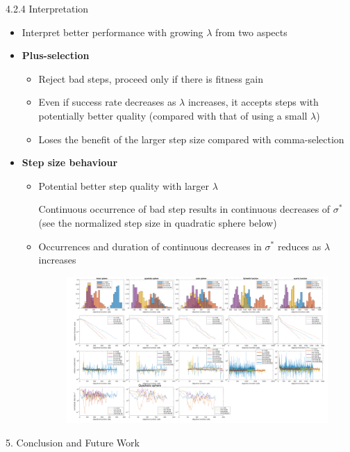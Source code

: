 \documentclass{beamer}
\begin{document}
\begin{frame}{4.2.4 Interpretation}
\begin{itemize}
    \item Interpret better performance with growing $\lambda$ from two aspects
    \item \textbf{Plus-selection }
        \begin{itemize}
            \item Reject bad steps, proceed only if there is fitness gain
            \item Even if success rate decreases as $\lambda$ increases, it accepts steps with potentially better quality (compared with that of using a small $\lambda$)
            \item Loses the benefit of the larger step size compared with comma-selection
        \end{itemize}
    \item \textbf{Step size behaviour}
    \begin{itemize}
            \item Potential better step quality with larger $\lambda$
            
            Continuous occurrence of bad step results in continuous decreases of $\sigma^*$ (see the normalized step size in quadratic sphere below) 
            \item Occurrences and duration of continuous decreases in $\sigma^*$ reduces as $\lambda$ increases
            \begin{figure}
            \includegraphics[width=0.405\linewidth]{normalized_step_emergency.pdf}
            \end{figure}
    \end{itemize}
    
\end{itemize}


\end{frame}

\begin{frame}[plain,c]
\begin{center}
\Huge 5. Conclusion and Future Work
\end{center}
\end{frame}
\end{document}

